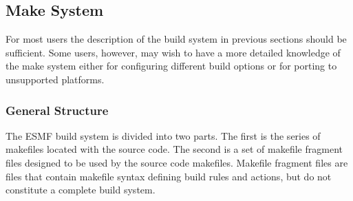 

\subsection{Make System}
\label{sec:make}
For most users the description of the build system in previous
sections should be sufficient.  Some users, however, may wish to have
a more detailed knowledge of the make system either for configuring
different build options or for porting to unsupported platforms.
\subsubsection{General Structure}

The ESMF build system is divided into two parts.  The first is the
series of makefiles located with the source code.  The second is a set
of makefile fragment files designed to be used by the source code
makefiles.  Makefile fragment files are files that contain makefile
syntax defining build rules and actions, but do not constitute a
complete build system.

